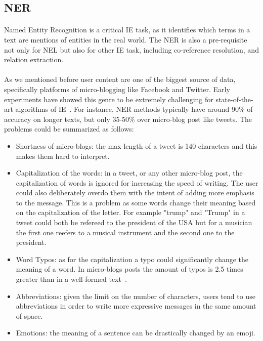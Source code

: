 \subsection{NER}
\paragraph{}
Named Entity Recognition is a critical IE task, as it identifies which terms in a text are mentions of entities in the real world. The NER is also a pre-requisite not only for NEL but also for other IE task, including co-reference resolution, and relation extraction.

\paragraph{}
As we mentioned before user content are one of the biggest source of data, specifically platforms of micro-blogging like Facebook and Twitter. Early experiments have showed this genre to be extremely challenging for state-of-the-art algorithms of IE~\cite{derczynski2013microblog}. For instance, NER methods typically have around 90\% of accuracy on longer texts, but only 35-50\% over micro-blog post like tweets. The problems could be summarized as follows:

\begin{itemize}
\item Shortness of micro-blogs: the max length of a tweet is 140 characters and this makes them hard to interpret.
\item Capitalization of the words: in a tweet, or any other micro-blog post, the capitalization of words is ignored for increasing the speed of writing. The user could also deliberately overdo them with the intent of adding more emphasis to the message. This is a problem as some words change their meaning based on the capitalization of the letter. For example "trump" and "Trump" in a tweet could both be refereed to the president of the USA but for a musician the first one reefers to a musical instrument and the second one to the president.
\item Word Typos: as for the capitalization a typo could significantly change the meaning of a word. In micro-blogs posts the amount of typos is 2.5 times greater than in a well-formed text~\cite{derczynski2015analysis}.
\item Abbreviations: given the limit on the number of characters, users tend to use abbreviations in order to write more expressive messages in the same amount of space.
\item Emotions: the meaning of a sentence can be drastically changed by an emoji.
\end{itemize}
